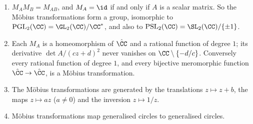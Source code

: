 \begin{proposition}\label{complex-analysis:proposition-mobius}
\begin{enumerate}
\item $M_AM_B = M_{AB}$, and $M_A = \id$ if and only if $A$ is a scalar matrix. So the M\"obius transformations form a group, isomorphic to $\mathrm{PGL}_2(\CC) = \GL_2(\CC)/\CC^*$, and also to
$\mathrm{PSL}_2(\CC) = \SL_2(\CC)/\{\pm1\}$.
\item Each $M_A$ is a homeomorphism of $\hat{\CC}$ and a rational function of degree $1$; its derivative $\det A/(cz + d)^2$ never vanishes on $\CC \setminus \{-d/c\}$. Conversely every rational function of degree $1$, and
every bijective meromorphic function $\hat{\CC} \to \hat{\CC}$, is a M\"obius transformation.
\item The M\"obius transformations are generated by the translations $z \mapsto z + b$, the maps $z \mapsto az$ ($a \neq 0$) and the inversion $z \mapsto 1/z$.
\item M\"obius transformations map generalised circles to generalised circles.
\end{enumerate}
\end{proposition}

